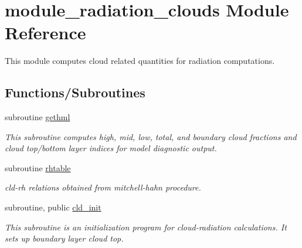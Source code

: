 \hypertarget{namespacemodule__radiation__clouds}{}\section{module\+\_\+radiation\+\_\+clouds Module Reference}
\label{namespacemodule__radiation__clouds}


This module computes cloud related quantities for radiation computations.  


\subsection*{Functions/\+Subroutines}
\begin{DoxyCompactItemize}
\item 
subroutine \hyperlink{namespacemodule__radiation__clouds_a804b4ff009a185405e39838a907f8591}{gethml}                                                                                               
\begin{DoxyCompactList}\small\item\em This subroutine computes high, mid, low, total, and boundary cloud fractions and cloud top/bottom layer indices for model diagnostic output. \end{DoxyCompactList}\item 
subroutine \hyperlink{namespacemodule__radiation__clouds_a7b3ef3c22abd161058fd8880d86b538a}{rhtable}                                                                                             
\begin{DoxyCompactList}\small\item\em cld-\/rh relations obtained from mitchell-\/hahn procedure. \end{DoxyCompactList}\end{DoxyCompactItemize}
{\bf }\par
\begin{DoxyCompactItemize}
\item 
subroutine, public \hyperlink{namespacemodule__radiation__clouds_ab6fef8945e0a409b2e0968b414ba5573}{cld\+\_\+init}                                                                                           
\begin{DoxyCompactList}\small\item\em This subroutine is an initialization program for cloud-\/radiation calculations. It sets up boundary layer cloud top. \end{DoxyCompactList}\end{DoxyCompactItemize}

